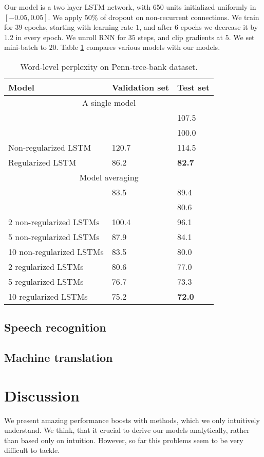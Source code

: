 \documentclass{article}
\begin{document}
Our model is a two layer LSTM network, with 650 units initialized uniformly in
$[-0.05, 0.05]$. We apply $50\%$ of dropout on non-recurrent connections. We train for
$39$ epochs, starting with learning rate $1$, and after $6$ epochs we decrease it by $1.2$ 
in every epoch. We unroll RNN for $35$ steps, and clip gradients at $5$. We set mini-batch
to $20$. Table \ref{tab:ptb} compares various models with our models. 

\begin{table}[t]
  \small
  \centering
  \renewcommand{\arraystretch}{1.15}
  \begin{tabular}{lll}
    \hline
     Model & Validation set & Test set \\
    \hline
    \multicolumn{3}{c}{A single model} \\
    \hline
    \cite{pascanu2013construct} & & 107.5 \\
    \cite{chenglanguage} & & 100.0 \\
    Non-regularized LSTM & 120.7 & 114.5 \\
    Regularized LSTM & 86.2 & {\bf 82.7} \\
    \hline
    \multicolumn{3}{c}{Model averaging} \\
    \hline
    \cite{mikolov2012statistical} & 83.5 & 89.4 \\
    \cite{chenglanguage} & & 80.6 \\
    2 non-regularized LSTMs & 100.4 & 96.1 \\
    5 non-regularized LSTMs & 87.9 & 84.1 \\
    10 non-regularized LSTMs & 83.5 & 80.0 \\
    2 regularized LSTMs & 80.6 & 77.0 \\
    5 regularized LSTMs & 76.7 & 73.3 \\
    10 regularized LSTMs & 75.2 & {\bf 72.0} \\
    \hline
  \end{tabular}
  \caption{Word-level perplexity on Penn-tree-bank dataset.}
  \label{tab:ptb}
\end{table}

\subsection{Speech recognition}
\label{sec:speech}

\subsection{Machine translation}
\label{sec:trans}

\section{Discussion}
We present amazing performance boosts with methods, which we 
only intuitively understand. We think, that it crucial
to derive our models analytically, rather than based only on
intuition. However, so far this problems seem to be very difficult to
tackle.




\end{document}

